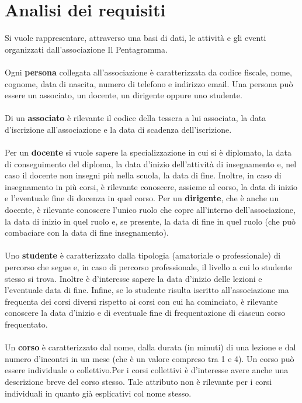 \documentclass[11pt]{article}
\begin{document}
\section{Analisi dei requisiti}
	Si vuole rappresentare, attraverso una basi di dati, le attività e gli eventi organizzati dall'associazione Il Pentagramma.\\\\
	Ogni \textbf{persona} collegata all'associazione è caratterizzata da codice fiscale, nome, cognome, data di nascita, numero di telefono e indirizzo email. Una persona può essere un associato, un docente, un dirigente oppure uno studente.\\\\
	Di un \textbf{associato} è rilevante il codice della tessera a lui associata, la data d'iscrizione all'associazione e la data di scadenza dell'iscrizione.\\\\
	Per un \textbf{docente} si vuole sapere la specializzazione in cui si è diplomato, la data di conseguimento del diploma, la data d'inizio dell'attività di insegnamento e, nel caso il docente non insegni più nella scuola, la data di fine. Inoltre, in caso di insegnamento in più corsi, è rilevante conoscere, assieme al corso, la data di inizio e l'eventuale fine di docenza in quel corso. Per un \textbf{dirigente}, che è anche un docente, è rilevante conoscere l'unico ruolo che copre all'interno dell'associazione, la data di inizio in quel ruolo e, se presente, la data di fine in quel ruolo (che può combaciare con la data di fine insegnamento).\\\\
	Uno \textbf{studente} è caratterizzato dalla tipologia (amatoriale o professionale) di percorso che segue e, in caso di percorso professionale, il livello a cui lo studente stesso si trova. Inoltre è d'interesse sapere la data d'inizio delle lezioni e l'eventuale data di fine. Infine, se lo studente risulta iscritto all'associazione ma frequenta dei corsi diversi rispetto ai corsi con cui ha cominciato, è rilevante conoscere la data d'inizio e di eventuale fine di frequentazione di ciascun corso frequentato.\\\\
	Un \textbf{corso} è caratterizzato dal nome, dalla durata (in minuti) di una lezione e dal numero d'incontri in un mese (che è un valore compreso tra 1 e 4). Un corso può essere individuale o collettivo.Per i corsi collettivi è d'interesse avere anche una descrizione breve del corso stesso. Tale attributo non è rilevante per i corsi individuali in quanto già esplicativi col nome stesso.\\\\
\end{document}
